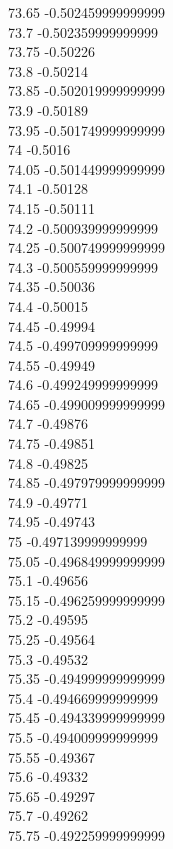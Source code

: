 {73.65	-0.502459999999999\\
73.7	-0.502359999999999\\
73.75	-0.50226\\
73.8	-0.50214\\
73.85	-0.502019999999999\\
73.9	-0.50189\\
73.95	-0.501749999999999\\
74	-0.5016\\
74.05	-0.501449999999999\\
74.1	-0.50128\\
74.15	-0.50111\\
74.2	-0.500939999999999\\
74.25	-0.500749999999999\\
74.3	-0.500559999999999\\
74.35	-0.50036\\
74.4	-0.50015\\
74.45	-0.49994\\
74.5	-0.499709999999999\\
74.55	-0.49949\\
74.6	-0.499249999999999\\
74.65	-0.499009999999999\\
74.7	-0.49876\\
74.75	-0.49851\\
74.8	-0.49825\\
74.85	-0.497979999999999\\
74.9	-0.49771\\
74.95	-0.49743\\
75	-0.497139999999999\\
75.05	-0.496849999999999\\
75.1	-0.49656\\
75.15	-0.496259999999999\\
75.2	-0.49595\\
75.25	-0.49564\\
75.3	-0.49532\\
75.35	-0.494999999999999\\
75.4	-0.494669999999999\\
75.45	-0.494339999999999\\
75.5	-0.494009999999999\\
75.55	-0.49367\\
75.6	-0.49332\\
75.65	-0.49297\\
75.7	-0.49262\\
75.75	-0.492259999999999\\
}
